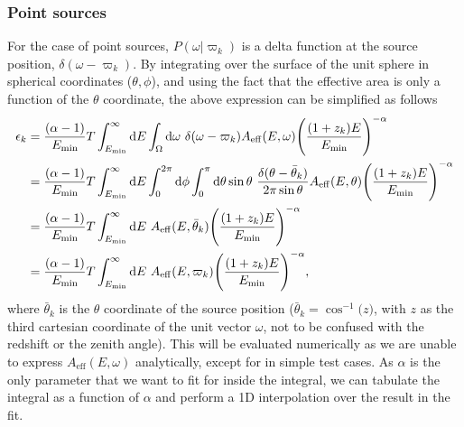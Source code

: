 \documentclass[fontsize=12pt]{article}
\begin{document}
\subsubsection{Point sources}
For the case of point sources, $P(\omega | \varpi_k)$ is a delta function at the source position, $\delta(\omega - \varpi_k)$. By integrating over the surface of the unit sphere in spherical coordinates ($\theta, \phi$), and using the fact that the effective area is only a function of the $\theta$ coordinate, the above expression can be simplified as follows
\begin{equation}
\begin{split}
\epsilon_{k} & = \frac{(\alpha -1)}{E_\mathrm{min}} T \int_{E_{\rm{min}}}^{\infty} \mathrm{d}E \int_\Omega \mathrm{d}\omega \ \delta(\omega - \varpi_k) A_\mathrm{eff}(E, \omega) \Bigg( \frac{(1+z_k)E}{E_\mathrm{min}} \Bigg)^{-\alpha} \\
& = \frac{(\alpha -1)}{E_\mathrm{min}} T \int_{E _\mathrm{min}}^{\infty} \mathrm{d}E \int_0^{2\pi} \mathrm{d}\phi \int_0^{\pi} \mathrm{d}\theta \sin{\theta} \ \frac{\delta(\theta - \bar{\theta}_k)}{2\pi \sin{\theta}} A_\mathrm{eff}(E, \theta) \Bigg( \frac{(1+z_k)E}{E_\mathrm{min}} \Bigg)^{-\alpha} \\
& = \frac{(\alpha -1)}{E_\mathrm{min}} T \int_{E _\mathrm{min}}^{\infty} \mathrm{d}E \ A_\mathrm{eff}(E, \bar{\theta}_k) \Bigg( \frac{(1+z_k)E}{E_\mathrm{min}} \Bigg)^{-\alpha} \\
& = \frac{(\alpha -1)}{E_\mathrm{min}} T \int_{E _\mathrm{min}}^{\infty} \mathrm{d}E \ A_\mathrm{eff}(E, \varpi_k) \Bigg( \frac{(1+z_k)E}{E_\mathrm{min}} \Bigg)^{-\alpha},
\end{split}
\end{equation}
where $\bar{\theta}_k$ is the $\theta$ coordinate of the source position ($\bar{\theta}_k = \cos^{-1}{(z})$, with $z$ as the third cartesian coordinate of the unit vector $\omega$, not to be confused with the redshift or the zenith angle). This will be evaluated numerically as we are unable to express $A_\mathrm{eff}(E, \omega)$ analytically, except for in simple test cases. As $\alpha$ is the only parameter that we want to fit for inside the integral, we can tabulate the integral as a function of $\alpha$ and perform a 1D interpolation over the result in the fit. 
\end{document}
